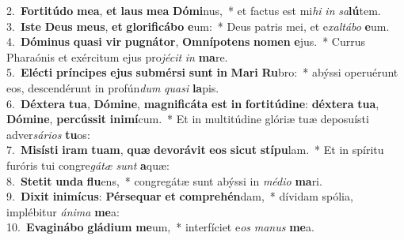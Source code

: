 {2.~}\textbf{For}\textbf{ti}\textbf{tú}\textbf{do} \textbf{me}\textbf{a}, \textbf{et} \textbf{laus} \textbf{me}\textbf{a} \textbf{Dó}\textbf{mi}nus,~* et factus est mi\textit{hi} \textit{in} \textit{sa}\textbf{lú}tem.\\
{3.~}\textbf{I}\textbf{ste} \textbf{De}\textbf{us} \textbf{me}\textbf{us}, \textbf{et} \textbf{glo}\textbf{ri}\textbf{fi}\textbf{cá}\textbf{bo} \textbf{e}um:~* Deus patris mei, et e\textit{xal}\textit{tá}\textit{bo} \textbf{e}um.\\
{4.~}\textbf{Dó}\textbf{mi}\textbf{nus} \textbf{qua}\textbf{si} \textbf{vir} \textbf{pu}\textbf{gná}\textbf{tor}, \textbf{Om}\textbf{ní}\textbf{po}\textbf{tens} \textbf{no}\textbf{men} \textbf{e}jus.~* Currus Pharaónis et exércitum ejus pro\textit{jé}\textit{cit} \textit{in} \textbf{ma}re.\\
{5.~}\textbf{E}\textbf{lé}\textbf{cti} \textbf{prín}\textbf{ci}\textbf{pes} \textbf{e}\textbf{jus} \textbf{sub}\textbf{mér}\textbf{si} \textbf{sunt} \textbf{in} \textbf{Ma}\textbf{ri} \textbf{Ru}bro:~* abýssi operuérunt eos, descendérunt in profún\textit{dum} \textit{qua}\textit{si} \textbf{la}pis.\\
{6.~}\textbf{Déx}\textbf{te}\textbf{ra} \textbf{tu}\textbf{a}, \textbf{Dó}\textbf{mi}\textbf{ne}, \textbf{ma}\textbf{gni}\textbf{fi}\textbf{cá}\textbf{ta} \textbf{est} \textbf{in} \textbf{for}\textbf{ti}\textbf{tú}\textbf{di}\textbf{ne}: \textbf{déx}\textbf{te}\textbf{ra} \textbf{tu}\textbf{a}, \textbf{Dó}\textbf{mi}\textbf{ne}, \textbf{per}\textbf{cús}\textbf{sit} \textbf{i}\textbf{ni}\textbf{mí}cum.~* Et in multitúdine glóriæ tuæ deposuísti adver\textit{sá}\textit{ri}\textit{os} \textbf{tu}os:\\
{7.~}\textbf{Mi}\textbf{sí}\textbf{sti} \textbf{i}\textbf{ram} \textbf{tu}\textbf{am}, \textbf{quæ} \textbf{de}\textbf{vo}\textbf{rá}\textbf{vit} \textbf{e}\textbf{os} \textbf{si}\textbf{cut} \textbf{stí}\textbf{pu}lam.~* Et in spíritu furóris tui congre\textit{gá}\textit{tæ} \textit{sunt} \textbf{a}quæ:\\
{8.~}\textbf{Ste}\textbf{tit} \textbf{un}\textbf{da} \textbf{flu}ens,~* congregátæ sunt abýssi in \textit{mé}\textit{di}\textit{o} \textbf{ma}ri.\\
{9.~}\textbf{Di}\textbf{xit} \textbf{i}\textbf{ni}\textbf{mí}\textbf{cus}: \textbf{Pér}\textbf{se}\textbf{quar} \textbf{et} \textbf{com}\textbf{pre}\textbf{hén}dam,~* dívidam spólia, implébitur \textit{á}\textit{ni}\textit{ma} \textbf{me}a:\\
{10.~}\textbf{E}\textbf{va}\textbf{gi}\textbf{ná}\textbf{bo} \textbf{glá}\textbf{di}\textbf{um} \textbf{me}um,~* interfíciet e\textit{os} \textit{ma}\textit{nus} \textbf{me}a.\\
